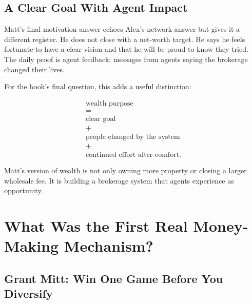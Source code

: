 \documentclass[11pt,oneside]{book}
\begin{document}
\section{A Clear Goal With Agent Impact}

Matt's final motivation answer echoes Alex's network answer but gives it a different register. He does not close with a net-worth target. He says he feels fortunate to have a clear vision and that he will be proud to know they tried. The daily proof is agent feedback: messages from agents saying the brokerage changed their lives.

For the book's final question, this adds a useful distinction:

\begin{equation}
\begin{gathered}
\text{wealth purpose}\\
=\\
\text{clear goal}\\
+\\
\text{people changed by the system}\\
+\\
\text{continued effort after comfort}.
\end{gathered}
\end{equation}

Matt's version of wealth is not only owning more property or closing a larger wholesale fee. It is building a brokerage system that agents experience as opportunity.


\chapter{What Was the First Real Money-Making Mechanism?}

\section{Grant Mitt: Win One Game Before You Diversify}
\end{document}
